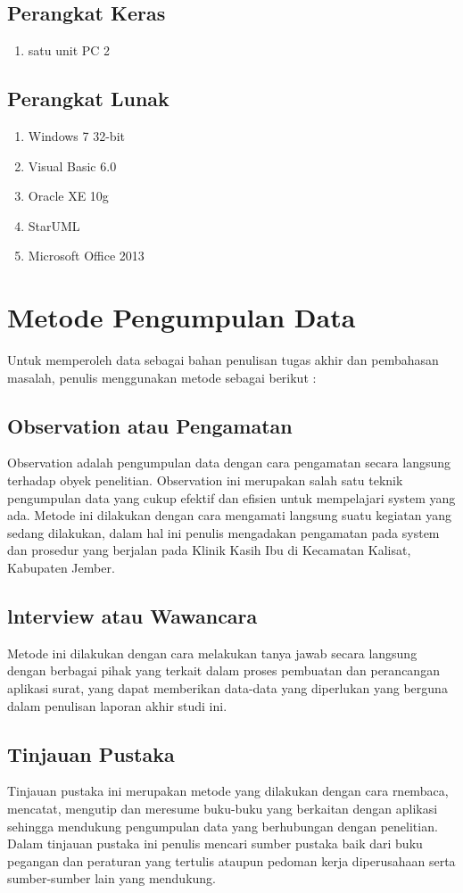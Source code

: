 \documentclass{jtetiproposalskripsi}
\begin{document}
\subsection{Perangkat Keras} 
\begin{enumerate}
\item satu unit PC 2
\end{enumerate}

\subsection{Perangkat Lunak}
\begin{enumerate}
\item Windows 7 32-bit
\item Visual Basic 6.0
\item Oracle XE 10g 
\item StarUML
\item Microsoft Office 2013
\end{enumerate}

\section{Metode Pengumpulan Data}
Untuk memperoleh data sebagai bahan penulisan tugas akhir dan pembahasan masalah, penulis menggunakan metode sebagai berikut :
\subsection{Observation atau Pengamatan}
Observation adalah pengumpulan data dengan cara pengamatan secara langsung terhadap obyek penelitian. Observation ini merupakan salah satu teknik pengumpulan data yang cukup efektif dan efisien untuk mempelajari system yang ada. Metode ini dilakukan dengan cara mengamati langsung suatu kegiatan yang sedang dilakukan, dalam hal ini penulis mengadakan pengamatan pada system dan prosedur yang berjalan pada Klinik Kasih Ibu di Kecamatan Kalisat, Kabupaten Jember.
\subsection{lnterview atau Wawancara}
Metode ini dilakukan dengan cara melakukan tanya jawab secara langsung dengan berbagai pihak yang terkait dalam proses pembuatan dan perancangan aplikasi surat, yang dapat memberikan data-data yang diperlukan yang berguna dalam penulisan laporan akhir studi ini.
\subsection{Tinjauan Pustaka}
Tinjauan pustaka ini merupakan metode yang dilakukan dengan cara rnembaca, mencatat, mengutip dan meresume buku-buku yang berkaitan dengan aplikasi sehingga mendukung pengumpulan data yang berhubungan dengan penelitian. Dalam tinjauan pustaka ini penulis mencari sumber pustaka baik dari buku pegangan dan peraturan yang tertulis ataupun pedoman kerja diperusahaan serta sumber-sumber lain yang mendukung.
\end{document}
